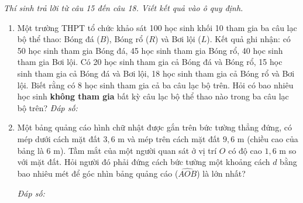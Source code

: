 \documentclass[12pt,a4paper]{article}
\newcommand{\parttitle}[1]{\par\vspace{1.5pt}{\large\bfseries\color{ink}#1}\par\vspace{1.0pt}}
\newcommand{\answerbox}{\hfill\textit{Đáp số:}\ \fbox{\rule{0pt}{10pt}\hspace{2.0cm}}}
\begin{document}
\parttitle{PHẦN III. Trắc nghiệm trả lời ngắn}
\textit{Thí sinh trả lời từ câu 15 đến câu 18. Viết kết quả vào ô quy định.}
\begin{enumerate}[resume]
\item Một trường THPT tổ chức khảo sát 100 học sinh khối 10 tham gia ba câu lạc bộ thể thao: Bóng đá ($B$), Bóng rổ ($R$) và Bơi lội ($L$). Kết quả ghi nhận: có 50 học sinh tham gia Bóng đá, 45 học sinh tham gia Bóng rổ, 40 học sinh tham gia Bơi lội. Có 20 học sinh tham gia cả Bóng đá và Bóng rổ, 15 học sinh tham gia cả Bóng đá và Bơi lội, 18 học sinh tham gia cả Bóng rổ và Bơi lội. Biết rằng có 8 học sinh tham gia cả ba câu lạc bộ trên. Hỏi có bao nhiêu học sinh \textbf{không tham gia} bất kỳ câu lạc bộ thể thao nào trong ba câu lạc bộ trên?
\answerbox

\item \begin{minipage}[t]{0.64\linewidth}
Một bảng quảng cáo hình chữ nhật được gắn trên bức tường thẳng đứng, có mép dưới cách mặt đất $3{,}6\text{ m}$ và mép trên cách mặt đất $9{,}6\text{ m}$ (chiều cao của bảng là $6\text{ m}$). Tầm mắt của một người quan sát ở vị trí $O$ có độ cao $1{,}6\text{ m}$ so với mặt đất. Hỏi người đó phải đứng cách bức tường một khoảng cách $d$ bằng bao nhiêu mét để góc nhìn bảng quảng cáo ($\widehat{AOB}$) là lớn nhất?
\vspace{4pt}

\answerbox
\end{minipage}%
\hfill
\begin{minipage}[t]{0.33\linewidth}
\centering
{}
\end{minipage}
\end{enumerate}
\end{document}

